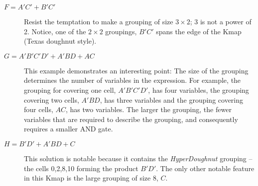 \begin{changemargin}{1.5cm}{1.5cm}

\begin{description}
\item [$F=A'C'+B'C'$]  
Resist the temptation to make a grouping of size $3 \times 2$;
3 is not a power of 2.  Notice, one of the $2 \times 2$
groupings, $B'C'$ spans the edge of the Kmap (Texas doughnut style).


\item [$G=A'B'C'D'+A'BD+AC$] 
This example demonstrates an interesting point: The size of the 
grouping determines the number of variables in the \SOPmin expression.
For example, the grouping for covering one cell, $A'B'C'D'$, has four
variables, the grouping covering two cells, $A'BD$, has three variables 
and the grouping covering four cells, $AC$, has two variables.  The 
larger the grouping, the fewer variables that are required to describe
the grouping, and consequently requires a smaller AND gate.

\item [$H=B'D'+A'BD+C$] 
This solution is notable because it contains the 
\textit{HyperDoughnut}  grouping -- the cells
0,2,8,10 forming the product $B'D'$.  The only other notable 
feature in this Kmap is the large grouping of size 8, $C$.
\end{description}
\end{changemargin}


